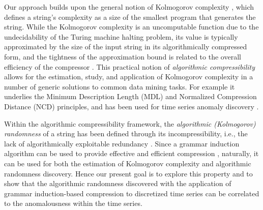 \documentclass{sig-alternate}
\begin{document}
Our approach builds upon the general notion of Kolmogorov complexity \cite{kolmogorov}, which defines a string's complexity as a size of the smallest program that generates the string. While the Kolmogorov complexity is an uncomputable function due to the undecidability of the Turing machine halting problem, its value is typically approximated by the size of the input string in its algorithmically compressed form, and the tightness of the approximation bound is related to the overall efficiency of the compressor \cite{solomonoff, li_vitanyi}. This practical notion of \textit{algorithmic compressibility} allows for the estimation, study, and application of Kolmogorov complexity in a number of generic solutions to common data mining tasks. For example it underlies the Minimum Description Length (MDL) \cite{mdl} and Normalized Compression Distance (NCD) \cite{ncd} principles, and has been used for time series anomaly discovery \cite{param_free}.

Within the algorithmic compressibility framework, the \textit{algorithmic (Kolmogorov) randomness} of a string has been defined through its incompressibility, i.e., the lack of algorithmically exploitable redundancy \cite{li_vitanyi, mdl, grigorieff, per_lof}. Since a grammar induction algorithm can be used to provide effective and efficient compression  \cite{compression}, naturally, it can be used for both the estimation of Kolmogorov complexity and algorithmic randomness discovery. Hence our present goal is to explore this property and to show that the algorithmic randomness discovered with the application of grammar induction-based compression to discretized time series can be correlated to the anomalousness within the time series.
\end{document}
